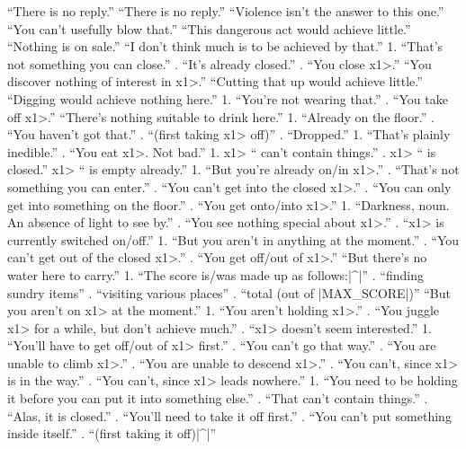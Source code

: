   ``There is no reply.''
   ``There is no reply.''
  ``Violence isn't the answer to this one.''
   ``You can't usefully blow that.''
   ``This dangerous act would achieve little.''
   ``Nothing is on sale.''
  ``I don't think much is to be achieved by that.''
  1. ``That's not something you can close.''
. ``It's already closed.''
. ``You close \<x1>.''
 ``You discover nothing of interest in \<x1>.''
   ``Cutting that up would achieve little.''
   ``Digging would achieve nothing here.''
 1. ``You're not wearing that.''
. ``You take off \<x1>.''
  ``There's nothing suitable to drink here.''
   1. ``Already on the floor.''
. ``You haven't got that.''
. ``(first taking \<x1> off)''
. ``Dropped.''
   1. ``That's plainly inedible.''
. ``You eat \<x1>. Not bad.''
  1. \<x1> `` can't contain things.''
. \<x1> `` is closed.''
\N   \<x1> `` is empty already.''
  1. ``But you're already on/in \<x1>.''
. ``That's not something you can enter.''
. ``You can't get into the closed \<x1>.''
. ``You can only get into something on the floor.''
. ``You get onto/into \<x1>.''
 1. ``Darkness, noun. An absence of light to see by.''
. ``You see nothing special about \<x1>.''
. ``\<x1> is currently switched on/off.''
   1. ``But you aren't in anything at the moment.''
. ``You can't get out of the closed \<x1>.''
. ``You get off/out of \<x1>.''
   ``But there's no water here to carry.''
 1. ``The score is/was made up as follows:|^|''
. ``finding sundry items''
. ``visiting various places''
. ``total (out of |MAX_SCORE|)''
  ``But you aren't on \<x1> at the moment.''
   1. ``You aren't holding \<x1>.''
. ``You juggle \<x1> for a while, but don't achieve much.''
. ``\<x1> doesn't seem interested.''
  1. ``You'll have to get off/out of \<x1> first.''
. ``You can't go that way.''
. ``You are unable to climb \<x1>.''
. ``You are unable to descend \<x1>.''
. ``You can't, since \<x1> is in the way.''
. ``You can't, since \<x1> leads nowhere.''
  1. ``You need to be holding it before you
can put it into something else.''
. ``That can't contain things.''
. ``Alas, it is closed.''
. ``You'll need to take it off first.''
. ``You can't put something inside itself.''
. ``(first taking it off)|^|''
